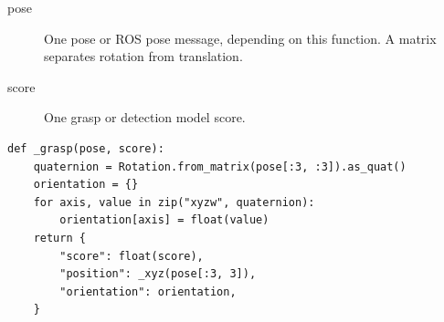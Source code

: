 \documentclass[11pt,a4paper]{book}
\begin{document}
\begin{description}
\item[pose] One pose or ROS pose message, depending on this function. A matrix separates rotation from translation.
\item[score] One grasp or detection model score.
\end{description}

\begin{lstlisting}[firstnumber=18]
def _grasp(pose, score):
    quaternion = Rotation.from_matrix(pose[:3, :3]).as_quat()
    orientation = {}
    for axis, value in zip("xyzw", quaternion):
        orientation[axis] = float(value)
    return {
        "score": float(score),
        "position": _xyz(pose[:3, 3]),
        "orientation": orientation,
    }


\end{lstlisting}
\end{document}
